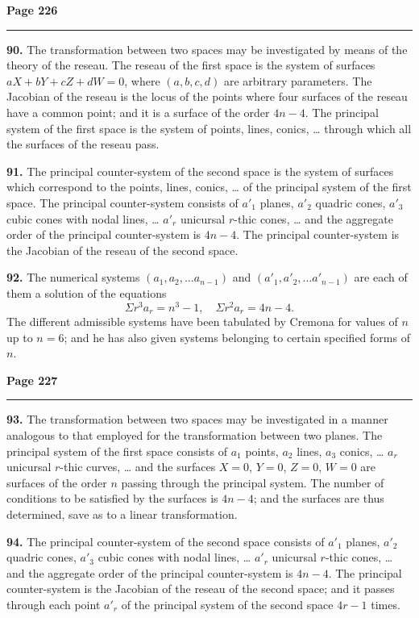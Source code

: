 \documentclass[12pt,a4paper]{article}
\theoremstyle{plain}
\theoremstyle{definition}
\theoremstyle{remark}
\begin{document}
\newpage
\noindent\textbf{Page 226}\\
\noindent\rule{\textwidth}{0.4pt}

\smallskip

\noindent\textbf{90.} The transformation between two spaces may be investigated by means of the theory of the reseau. The reseau of the first space is the system of surfaces $aX + bY + cZ + dW = 0$, where $(a, b, c, d)$ are arbitrary parameters. The Jacobian of the reseau is the locus of the points where four surfaces of the reseau have a common point; and it is a surface of the order $4n - 4$. The principal system of the first space is the system of points, lines, conics, \ldots{} through which all the surfaces of the reseau pass.

\textbf{91.} The principal counter-system of the second space is the system of surfaces which correspond to the points, lines, conics, \ldots{} of the principal system of the first space. The principal counter-system consists of $a'_1$ planes, $a'_2$ quadric cones, $a'_3$ cubic cones with nodal lines, \ldots{} $a'_r$ unicursal $r$-thic cones, \ldots{} and the aggregate order of the principal counter-system is $4n - 4$. The principal counter-system is the Jacobian of the reseau of the second space.

\textbf{92.} The numerical systems $(a_1, a_2, \ldots a_{n-1})$ and $(a'_1, a'_2, \ldots a'_{n-1})$ are each of them a solution of the equations
\[
\Sigma r^3 a_r = n^3 - 1, \quad \Sigma r^2 a_r = 4n - 4.
\]
The different admissible systems have been tabulated by Cremona for values of $n$ up to $n = 6$; and he has also given systems belonging to certain specified forms of $n$.

\newpage
\noindent\textbf{Page 227}\\
\noindent\rule{\textwidth}{0.4pt}

\smallskip

\noindent\textbf{93.} The transformation between two spaces may be investigated in a manner analogous to that employed for the transformation between two planes. The principal system of the first space consists of $a_1$ points, $a_2$ lines, $a_3$ conics, \ldots{} $a_r$ unicursal $r$-thic curves, \ldots{} and the surfaces $X = 0$, $Y = 0$, $Z = 0$, $W = 0$ are surfaces of the order $n$ passing through the principal system. The number of conditions to be satisfied by the surfaces is $4n - 4$; and the surfaces are thus determined, save as to a linear transformation.

\textbf{94.} The principal counter-system of the second space consists of $a'_1$ planes, $a'_2$ quadric cones, $a'_3$ cubic cones with nodal lines, \ldots{} $a'_r$ unicursal $r$-thic cones, \ldots{} and the aggregate order of the principal counter-system is $4n - 4$. The principal counter-system is the Jacobian of the reseau of the second space; and it passes through each point $a'_r$ of the principal system of the second space $4r - 1$ times.
\end{document}
